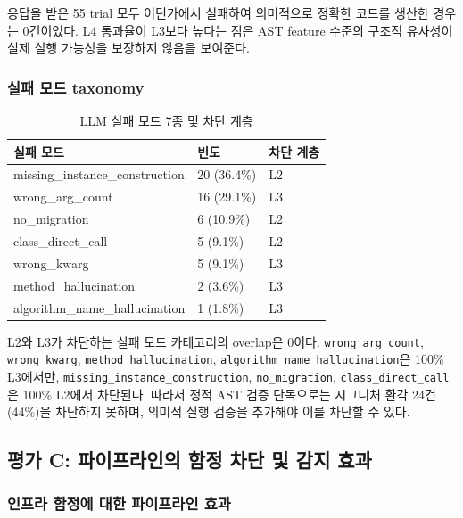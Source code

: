 응답을 받은 55 trial 모두 어딘가에서 실패하여 의미적으로 정확한 코드를 생산한 경우는 0건이었다.
L4 통과율이 L3보다 높다는 점은 AST feature 수준의 구조적 유사성이 실제 실행 가능성을 보장하지 않음을 보여준다.

\subsubsection{실패 모드 taxonomy}

\begin{table}[htbp]
\centering
\renewcommand{\arraystretch}{1.3}
\caption{LLM 실패 모드 7종 및 차단 계층}
\label{tab:llm_taxonomy}
\begin{tabular}{p{5cm}ll}
\toprule
실패 모드 & 빈도 & 차단 계층 \\
\midrule
missing\_instance\_construction & 20 (36.4\%) & L2 \\
wrong\_arg\_count & 16 (29.1\%) & L3 \\
no\_migration & 6 (10.9\%) & L2 \\
class\_direct\_call & 5 (9.1\%) & L2 \\
wrong\_kwarg & 5 (9.1\%) & L3 \\
method\_hallucination & 2 (3.6\%) & L3 \\
algorithm\_name\_hallucination & 1 (1.8\%) & L3 \\
\bottomrule
\end{tabular}
\end{table}

L2와 L3가 차단하는 실패 모드 카테고리의 overlap은 0이다.
\texttt{wrong\_arg\_count}, \texttt{wrong\_kwarg}, \texttt{method\_hallucination}, \texttt{algorithm\_name\_hallucination}은 100\% L3에서만, \texttt{missing\_instance\_construction}, \texttt{no\_migration}, \texttt{class\_direct\_call}은 100\% L2에서 차단된다.
따라서 정적 AST 검증 단독으로는 시그니처 환각 24건(44\%)을 차단하지 못하며, 의미적 실행 검증을 추가해야 이를 차단할 수 있다.

\subsection{평가 C: 파이프라인의 함정 차단 및 감지 효과}

\subsubsection{인프라 함정에 대한 파이프라인 효과}

